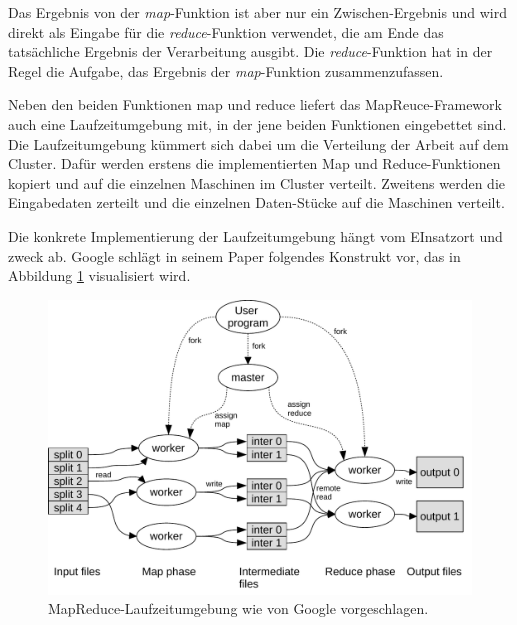 Das Ergebnis von der \textit{map}-Funktion ist aber nur ein Zwischen-Ergebnis und wird direkt als Eingabe für die \textit{reduce}-Funktion verwendet,
die am Ende das tatsächliche Ergebnis der Verarbeitung ausgibt. Die \textit{reduce}-Funktion hat in der Regel die Aufgabe, das Ergebnis der \textit{map}-Funktion
zusammenzufassen.  


Neben den beiden Funktionen map und reduce liefert das MapReuce-Framework auch eine Laufzeitumgebung mit, in der jene beiden Funktionen eingebettet sind.
Die Laufzeitumgebung kümmert sich dabei um die Verteilung der Arbeit auf dem Cluster. 
Dafür werden erstens die implementierten Map und Reduce-Funktionen
kopiert und auf die einzelnen Maschinen im Cluster verteilt. Zweitens werden die Eingabedaten zerteilt und die einzelnen Daten-Stücke auf die Maschinen verteilt. 

Die konkrete Implementierung der Laufzeitumgebung hängt vom EInsatzort und zweck ab. 
Google schlägt in seinem Paper folgendes Konstrukt vor, das in Abbildung \ref{fig:mapreduce} visualisiert wird.

\begin{figure}
\centering
\includegraphics[width=1.0\textwidth]{images/mapreduce.pdf}
\caption{MapReduce-Laufzeitumgebung wie von Google vorgeschlagen. \cite{miner2012mapreduce}}
\label{fig:mapreduce}
\end{figure}

